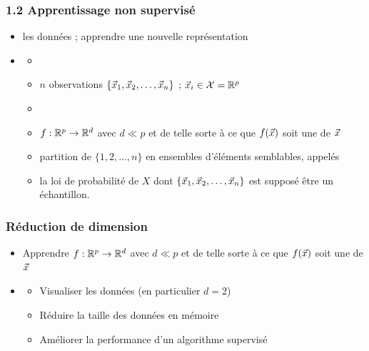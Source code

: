 \begin{frame}
  \frametitle{1.2 Apprentissage non supervisé}
  \begin{center}
  \end{center}
  \begin{itemize}
  \item {}  les données ; apprendre une nouvelle représentation
  \pause
  \item {}
    \begin{itemize}
    \item[]  
    \item[] $n$ observations $\{\vec{x}_1, \vec{x}_2, \dots, \vec{x}_n\}$ ; $\vec{x}_i \in \mathcal{X} = {\mathbb R}^p$
      \vspace{.5em}
    \item[] 
    \pause
      \item {} $f : {\mathbb R}^p \rightarrow {\mathbb R}^d$ avec
        $d \ll p$ et de telle sorte à ce que $f(\vec{x})$ soit une
         de $\vec{x}$
      \pause
      \item {} partition de $\{1, 2, \dots, n\}$ en ensembles
        d'éléments semblables, appelés 
      \pause
      \item {} la loi de probabilité de $X$ dont
        $\{\vec{x}_1, \vec{x}_2, \dots, \vec{x}_n\}$ est supposé être un échantillon.
    \end{itemize}
  \end{itemize}
\end{frame}

\begin{frame}
  \frametitle{Réduction de dimension}
  \begin{itemize}
  \item[] Apprendre $f : {\mathbb R}^p \rightarrow {\mathbb R}^d$ avec $d \ll p$ et de telle
    sorte à ce que $f(\vec{x})$ soit une  de
    $\vec{x}$
  \item {}
    \begin{itemize}
    \item Visualiser les données (en particulier $d=2$)
    \item Réduire la taille des données en mémoire
    \item Améliorer la performance d'un algorithme supervisé
    \end{itemize}
  \end{itemize}
\end{frame}

